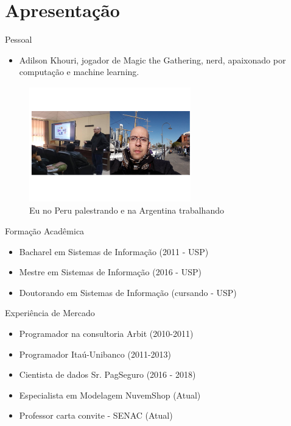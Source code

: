 \section*{Apresentação}

\begin{frame}	
	\begin{block}{Pessoal}	
		\begin{itemize}
			\item Adilson Khouri,  jogador de Magic the Gathering, nerd, apaixonado por computação e machine learning.
		\end{itemize}
		\begin{figure}[!htb]
			\centering	  				
			\includegraphics[height=5cm, width = 7cm]{./pic/join.png}
			\caption{Eu no Peru palestrando e na Argentina trabalhando}
			\label{fig_adilson_argentina}
		\end{figure}
		
	\end{block}
\end{frame}
			
\begin{frame}	
	\begin{block}{Formação Acadêmica}
		 \begin{itemize}
			  \item Bacharel em Sistemas de Informação (2011 - USP)
			  \item Mestre em Sistemas de Informação (2016 - USP)
			  \item Doutorando em Sistemas de Informação (cursando - USP)
		  \end{itemize}
	\end{block}
\end{frame}

\begin{frame}	
	\begin{block}{Experiência de Mercado}
		\begin{itemize}
			\item Programador na consultoria Arbit (2010-2011)
			\item Programador Itaú-Unibanco (2011-2013)
			\item Cientista de dados Sr. PagSeguro (2016 - 2018)
			\item Especialista em Modelagem NuvemShop (Atual)
			\item Professor carta convite - SENAC (Atual)
		\end{itemize}
	\end{block}
\end{frame}

